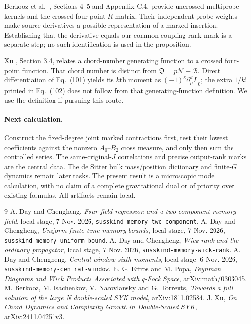 \documentclass[11pt]{article}
\newcommand{\NN}{\mathcal N}
\newcommand{\RR}{\mathcal R}
\newcommand{\DD}{\mathfrak D}
\begin{document}
Berkooz et al.\ \cite{BINT}, Sections 4--5 and Appendix C.4,
provide uncrossed multiprobe kernels and the crossed four-point
$R$-matrix. Their independent probe weights make source derivatives
a possible representation of a marked insertion. Establishing that
the derivative equals our common-coupling rank mark is a separate
step; no such identification is used in the proposition.

Xu \cite{Xu}, Section 3.4, relates a chord-number generating function
to a crossed four-point function. That chord number is distinct from
$\DD=p\NN-\RR$. Direct differentiation of Eq.\ (101) yields its
$k$th moment as $(-1)^k\partial_\mu^kI|_0$; the extra $1/k!$ printed
in Eq.\ (102) does not follow from that generating-function definition.
We use the definition if pursuing this route.

\paragraph{Next calculation.}
Construct the fixed-degree joint marked contractions first, test
their lowest coefficients against the nonzero $A_0$--$B_2$ cross
measure, and only then sum the controlled series. The same-original-$J$
correlations and precise output-rank marks are the central data.
The de Sitter bulk mass/position dictionary and finite-$G$ dynamics
remain later tasks. The present result is a microscopic model
calculation, with no claim of a complete gravitational dual or of
priority over existing formulas. All artifacts remain local.

\newpage
\begin{thebibliography}{9}\small
{} A. Day and Chengheng, \emph{Four-field regression and a
two-component memory field}, local stage, 7 Nov. 2026,
\texttt{susskind-memory-two-component}.
 A. Day and Chengheng, \emph{Uniform finite-time memory
bounds}, local stage, 7 Nov. 2026, \texttt{susskind-memory-uniform-bound}.
 A. Day and Chengheng, \emph{Wick rank and the ordinary
propagator}, local stage, 7 Nov. 2026, \texttt{susskind-memory-wick-rank}.
 A. Day and Chengheng, \emph{Central-window sixth
moments}, local stage, 6 Nov. 2026, \texttt{susskind-memory-central-window}.
 E. G. Effros and M. Popa, \emph{Feynman Diagrams and Wick
Products Associated with $q$-Fock Space},
\href{https://arxiv.org/abs/math/0303045}{arXiv:math/0303045}.
 M. Berkooz, M. Isachenkov, V. Narovlansky and G. Torrents,
\emph{Towards a full solution of the large N double-scaled SYK model},
\href{https://arxiv.org/abs/1811.02584}{arXiv:1811.02584}.
 J. Xu, \emph{On Chord Dynamics and Complexity Growth in
Double-Scaled SYK},
\href{https://arxiv.org/abs/2411.04251}{arXiv:2411.04251v3}.
\end{thebibliography}
\end{document}
